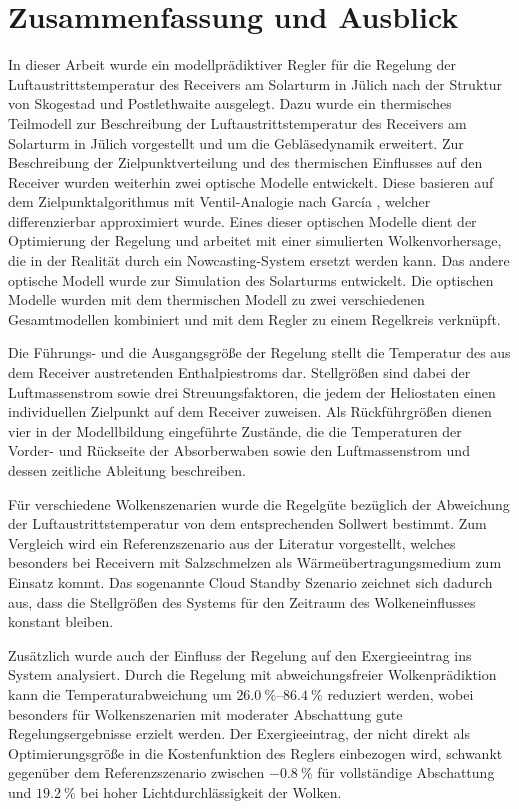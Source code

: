 \chapter{Zusammenfassung und Ausblick} \label{ch_Fazit}
In dieser Arbeit wurde ein modellprädiktiver Regler für die Regelung der Luftaustrittstemperatur des Receivers am Solarturm in Jülich nach der Struktur von Skogestad und Postlethwaite \cite[S.1]{Skogestad} ausgelegt.
Dazu wurde ein thermisches Teilmodell zur Beschreibung der Luftaustrittstemperatur des Receivers am Solarturm in Jülich vorgestellt und um die Gebläsedynamik erweitert.
Zur Beschreibung der Zielpunktverteilung und des thermischen Einflusses auf den Receiver wurden weiterhin zwei optische Modelle entwickelt.
Diese basieren auf dem Zielpunktalgorithmus mit Ventil-Analogie nach García \cite{Garcia2}, welcher differenzierbar approximiert wurde.
Eines dieser optischen Modelle dient der Optimierung der Regelung und arbeitet mit einer simulierten Wolkenvorhersage, die in der Realität durch ein Nowcasting-System ersetzt werden kann.
Das andere optische Modell wurde zur Simulation des Solarturms entwickelt.
Die optischen Modelle wurden mit dem thermischen Modell zu zwei verschiedenen Gesamtmodellen kombiniert und mit dem Regler zu einem Regelkreis verknüpft.

Die Führungs- und die Ausgangsgröße der Regelung stellt die Temperatur des aus dem Receiver austretenden Enthalpiestroms dar.
Stellgrößen sind dabei der Luftmassenstrom sowie drei Streuungsfaktoren, die jedem der Heliostaten einen individuellen Zielpunkt auf dem Receiver zuweisen.
Als Rückführgrößen dienen vier in der Modellbildung eingeführte Zustände, die die Temperaturen der Vorder- und Rückseite der Absorberwaben sowie den Luftmassenstrom und dessen zeitliche Ableitung beschreiben.

Für verschiedene Wolkenszenarien wurde die Regelgüte bezüglich der Abweichung der Luftaustrittstemperatur von dem entsprechenden Sollwert bestimmt.
Zum Vergleich wird ein Referenzszenario aus der Literatur vorgestellt, welches besonders bei Receivern mit Salzschmelzen als Wärmeübertragungsmedium zum Einsatz kommt.
Das sogenannte Cloud Standby Szenario zeichnet sich dadurch aus, dass die Stellgrößen des Systems für den Zeitraum des Wolkeneinflusses konstant bleiben.

Zusätzlich wurde auch der Einfluss der Regelung auf den Exergieeintrag ins System analysiert.
Durch die Regelung mit abweichungsfreier Wolkenprädiktion kann die Temperaturabweichung um $\SIrange{26.0}{86.4}{\percent}$ reduziert werden, wobei besonders für Wolkenszenarien mit moderater Abschattung gute Regelungsergebnisse erzielt werden.
Der Exergieeintrag, der nicht direkt als Optimierungsgröße in die Kostenfunktion des Reglers einbezogen wird, schwankt gegenüber dem Referenzszenario zwischen $\SI{-0.8}{\percent}$ für vollständige Abschattung und $\SI{+19.2}{\percent}$ bei hoher Lichtdurchlässigkeit der Wolken.

